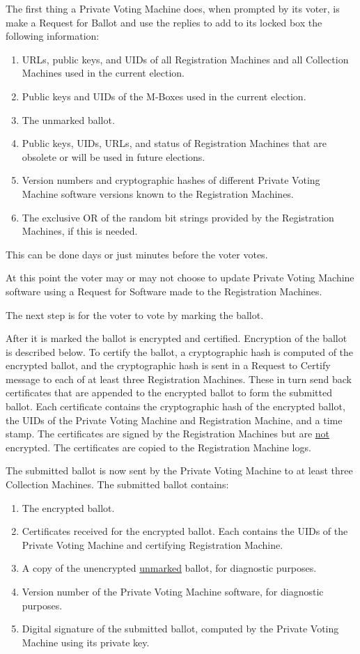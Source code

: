 \documentclass[12pt]{article}
\begin{document}
The first thing a Private Voting Machine does, when prompted by
its voter, is make a Request for Ballot and use the replies to
add to its locked box the following information:
\begin{enumerate}
\setcounter{enumi}{\value{PVM-COUNTER}}
\item URLs, public keys, and UIDs
of all Registration Machines and all Collection
Machines used in the current election.
\item Public keys and UIDs of the M-Boxes used in the current election.
\item The unmarked ballot.
\item Public keys, UIDs, URLs, and status of Registration Machines that are
obsolete or will be used in future elections.
\item Version numbers and cryptographic hashes of different Private
Voting Machine software versions known to the Registration Machines.
\item The exclusive OR of the random bit strings provided by the
Registration Machines, if this is needed.
\end{enumerate}
This can be done days or just minutes before the voter votes.

At this point
the voter may or may not choose to update Private Voting Machine
software using a Request for Software made to the Registration Machines.

The next step is for the voter to vote by marking the ballot.

After it is marked the ballot is encrypted and certified.  Encryption of the
ballot is described below.  To certify the ballot, a cryptographic hash
is computed of the encrypted ballot, and the cryptographic hash is sent
in a Request to Certify message to each of at least three Registration
Machines.  These in turn send back certificates that are appended
to the encrypted ballot to form the submitted ballot.  Each
certificate contains the cryptographic hash of the encrypted ballot, the
UIDs of the Private Voting Machine and Registration Machine,
and a time stamp.  The certificates
are signed by the Registration Machines but are \underline{not} encrypted.
The certificates are copied to the Registration Machine logs.

The submitted ballot is now sent by the Private Voting
Machine to at least three Collection Machines.  The submitted
ballot contains:
\begin{enumerate}
\item The encrypted ballot.
\item Certificates received for the encrypted ballot.  Each contains the
UIDs of the Private Voting Machine and certifying Registration Machine.
\item A copy of the unencrypted \underline{unmarked} ballot, for
diagnostic purposes.
\item Version number of the Private Voting Machine software, for
diagnostic purposes.
\item Digital signature of the submitted ballot, computed by the
Private Voting Machine using its private key.
\end{enumerate}
\end{document}
